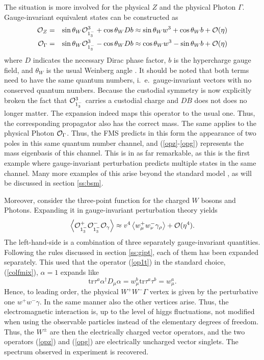 \documentclass[final,12pt,3p,longtitle]{elsarticle}
\newcommand*{\no}{\noindent}
\newcommand*{\bea}{\begin{eqnarray}}
\newcommand*{\eea}{\end{eqnarray}}
\newcommand*{\be}{\begin{equation}}
\newcommand*{\ee}{\end{equation}}
\newcommand*{\pref}[1]{(\ref{#1})}
\newcommand*{\prefr}[2]{(\ref{#1}-\ref{#2})}
\newcommand*{\nn}{\nonumber}
\newcommand*{\tr}{\mathrm{tr}}
\newcommand*{\1}{1\!\!\!\bot}
\newcommand*{\la}{\left\langle}
\newcommand*{\ra}{\right\rangle}
\newcommand*{\op}{{\cal O}}
\begin{document}
The situation is more involved for the physical $Z$ and the physical Photon $\Gamma$. Gauge-invariant equivalent states can be constructed as
\bea
\op_Z&=&\sin\theta_W\op_{1^-_3}^3+\cos\theta_W Db\approx \sin\theta_W w^3+\cos\theta_W b+\op(\eta)\label{opz}\\
\op_\Gamma&=&\sin\theta_W\op_{1^-_3}^3-\cos\theta_W Db\approx \cos\theta_W w^3-\sin\theta_W b+\op(\eta)\label{opg}
\eea
\no where $D$ indicates the necessary Dirac phase factor, $b$ is the hypercharge gauge field, and $\theta_W$ is the usual Weinberg angle \cite{Bohm:2001yx}. It should be noted that both terms need to have the same quantum numbers, i.\ e.\ gauge-invariant vectors with no conserved quantum numbers. Because the custodial symmetry is now explicitly broken the fact that $\op_{1^-_3}^3$ carries a custodial charge and $DB$ does not does no longer matter. The expansion indeed maps this operator to the usual one. Thus, the corresponding propagator also has the correct mass. The same applies to the physical Photon $\op_\Gamma$. Thus, the FMS predicts in this form the appearance of two poles in this same quantum number channel, and \prefr{opz}{opg} represents the mass eigenbasis of this channel. This is in as far remarkable, as this is the first example where gauge-invariant perturbation predicts multiple states in the same channel. Many more examples of this arise beyond the standard model \cite{Maas:2017xzh}, as will be discussed in section \ref{ss:bsm}.

Moreover, consider the three-point function for the charged $W$ bosons and Photons. Expanding it in gauge-invariant perturbation theory yields
\be
\la\op_{1_3^-}^+\op_{1_3^-}^-\op_\gamma\ra\approx v^4\la w_\mu^+w_\nu^-\gamma_\rho\ra+\op(\eta^4)\label{electric}.
\ee
\no The left-hand-side is a combination of three separately gauge-invariant quantities. Following the rules discussed in section \ref{ss:gipt}, each of them has been expanded separately. This used that the operator \pref{op1t} in the standard choice, \pref{colfmix}, $\alpha=1$ expands like
\be
\tr\tau^a\alpha^\dagger D_\mu\alpha=w_\mu^b\tr\tau^a\tau^b=w_\mu^a\nn.
\ee
\no Hence, to leading order, the physical $W^+W^-\Gamma$ vertex is given by the perturbative one $w^+w^-\gamma$. In the same manner also the other vertices arise. Thus, the electromagnetic interaction is, up to the level of higgs fluctuations, not modified when using the observable particles instead of the elementary degrees of freedom. Thus, the $W^\pm$ are then the electrically charged vector operators, and the two operators \pref{opz} and \pref{opg} are electrically uncharged vector singlets. The spectrum observed in experiment is recovered.
\end{document}
